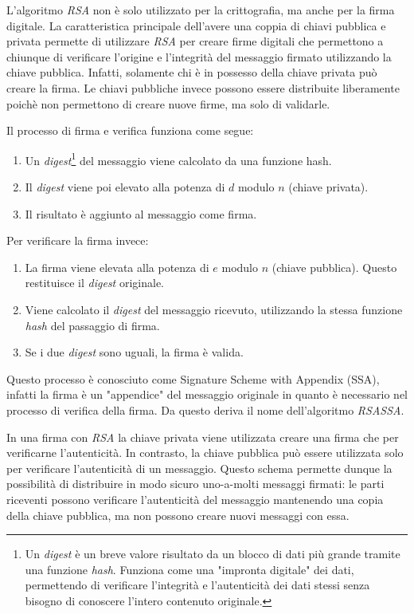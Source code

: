 L'algoritmo \emph{RSA} non è solo utilizzato per la crittografia, ma anche per la firma digitale.
La caratteristica principale dell'avere una coppia di chiavi pubblica e privata permette di utilizzare \emph{RSA} per creare firme digitali che permettono a chiunque di verificare l'origine e l'integrità del messaggio firmato utilizzando la chiave pubblica.
Infatti, solamente chi è in possesso della chiave privata può creare la firma.
Le chiavi pubbliche invece possono essere distribuite liberamente poichè non permettono di creare nuove firme, ma solo di validarle.

\noindent Il processo di firma e verifica funziona come segue:
\begin{enumerate}
	\item Un \emph{digest}\footnote{Un \emph{digest} è un breve valore risultato da un blocco di dati più grande tramite una funzione \emph{hash}. Funziona come una "impronta digitale" dei dati, permettendo di verificare l'integrità e l'autenticità dei dati stessi senza bisogno di conoscere l'intero contenuto originale.} del messaggio viene calcolato da una funzione hash.
	\item Il \emph{digest} viene poi elevato alla potenza di $d$ modulo $n$ (chiave privata).
	\item Il risultato è aggiunto al messaggio come firma.
\end{enumerate}
Per verificare la firma invece:
\begin{enumerate}
	\item La firma viene elevata alla potenza di $e$ modulo $n$ (chiave pubblica). Questo restituisce il \emph{digest} originale.
	\item Viene calcolato il \emph{digest} del messaggio ricevuto, utilizzando la stessa funzione \emph{hash} del passaggio di firma.
	\item Se i due \emph{digest} sono uguali, la firma è valida.
\end{enumerate}

Questo processo è conosciuto come Signature Scheme with Appendix (SSA), infatti la firma è un "appendice" del messaggio originale in quanto è necessario nel processo di verifica della firma.
Da questo deriva il nome dell'algoritmo \emph{RSASSA}.

In una firma con \emph{RSA} la chiave privata viene utilizzata creare una firma che per verificarne l'autenticità.
In contrasto, la chiave pubblica può essere utilizzata solo per verificare l'autenticità di un messaggio.
Questo schema permette dunque la possibilità di distribuire in modo sicuro uno-a-molti messaggi firmati: le parti riceventi possono verificare l'autenticità del messaggio mantenendo una copia della chiave pubblica, ma non possono creare nuovi messaggi con essa.
